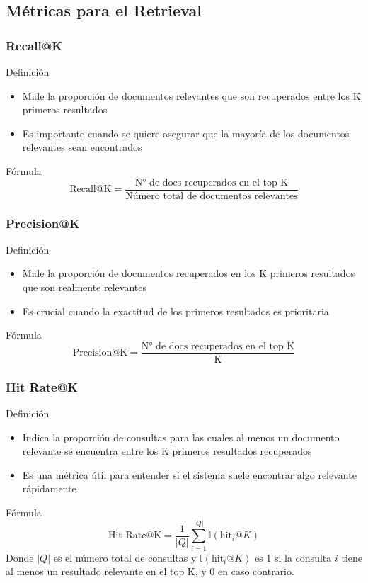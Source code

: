 \documentclass[handout]{beamer}
\begin{document}
\subsection{Métricas para el Retrieval}
\begin{frame}
  \frametitle{Recall@K}
  \begin{block}{Definición}
    \begin{itemize}
        \item Mide la proporción de documentos relevantes que son recuperados entre los K primeros resultados
        \item Es importante cuando se quiere asegurar que la mayoría de los documentos relevantes sean encontrados
    \end{itemize}
  \end{block}
  \begin{block}{Fórmula}
    \[ \text{Recall@K} = \frac{\text{N° de docs recuperados en el top K}}{\text{Número total de documentos relevantes}} \]
  \end{block}
\end{frame}

\begin{frame}
  \frametitle{Precision@K}
  \begin{block}{Definición}
    \begin{itemize}
        \item Mide la proporción de documentos recuperados en los K primeros resultados que son realmente relevantes
        \item Es crucial cuando la exactitud de los primeros resultados es prioritaria
    \end{itemize}
  \end{block}
  \begin{block}{Fórmula}
    \[ \text{Precision@K} = \frac{\text{N° de docs recuperados en el top K}}{\text{K}} \]
  \end{block}
\end{frame}

\begin{frame}
  \frametitle{Hit Rate@K}
  \begin{block}{Definición}
    \begin{itemize}
        \item Indica la proporción de consultas para las cuales al menos un documento relevante se encuentra entre los K primeros resultados recuperados
        \item Es una métrica útil para entender si el sistema suele encontrar algo relevante rápidamente
    \end{itemize}
  \end{block}
  \begin{block}{Fórmula}
    \[ \text{Hit Rate@K} = \frac{1}{|Q|} \sum_{i=1}^{|Q|} \mathbb{I}(\text{hit}_i@K) \]
    Donde \(|Q|\) es el número total de consultas y \(\mathbb{I}(\text{hit}_i@K)\) es 1 si la consulta \(i\) tiene al menos un resultado relevante en el top K, y 0 en caso contrario.
  \end{block}
\end{frame}
\end{document}
